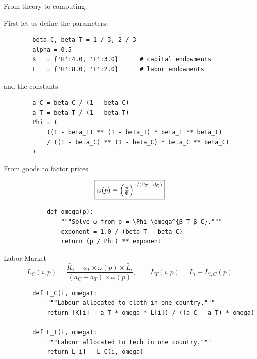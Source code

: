 \documentclass[notes,11pt, aspectratio=169, xcolor=table]{beamer}
\newenvironment{wideitemize}{\itemize\addtolength{\itemsep}{10pt}}{\enditemize}
\begin{document}
\begin{frame}[fragile=singleslide]{From theory to computing}

\begin{wideitemize}
    \item First let us define the parameters:

        \begin{verbatim}
        beta_C, beta_T = 1 / 3, 2 / 3
        alpha = 0.5
        K   = {'H':4.0, 'F':3.0}      # capital endowments
        L   = {'H':8.0, 'F':2.0}      # labor endowments
        \end{verbatim}    

    \item and the constants

        \begin{verbatim}
        a_C = beta_C / (1 - beta_C)
        a_T = beta_T / (1 - beta_T)
        Phi = (
            ((1 - beta_T) ** (1 - beta_T) * beta_T ** beta_T)
            / ((1 - beta_C) ** (1 - beta_C) * beta_C ** beta_C)
        )
        \end{verbatim}    

\end{wideitemize}
    
\end{frame}


\begin{frame}[fragile=singleslide]{From goods to factor prices}

    \begin{equation*}
    \boxed{
        \omega(p) \equiv \Bigl(\tfrac{p}{\Phi}\Bigr)^{1/(\beta_T-\beta_C)}
    }
    \end{equation*}

        
        \begin{verbatim}
            def omega(p):
                """Solve ω from p = \Phi \omega^{β_T-β_C}."""
                exponent = 1.0 / (beta_T - beta_C)
                return (p / Phi) ** exponent
        \end{verbatim}    

\end{frame}

\begin{frame}[fragile=singleslide]{Labor Market}
\begin{equation*}\label{eq: lc}
    \boxed{
    L_{C}(i,p) = \frac{\bar{K}_i - a_T \times \omega(p) \times \bar{L}_i}{(a_C- a_T) \times \omega(p)}, \qquad L_{T}(i,p) = \bar{L}_i - L_{i,C}(p)
    }
\end{equation*}

        \begin{verbatim}
        def L_C(i, omega):
            """Labour allocated to cloth in one country."""
            return (K[i] - a_T * omega * L[i]) / ((a_C - a_T) * omega)
        
        def L_T(i, omega):
            """Labour allocated to tech in one country."""
            return L[i] - L_C(i, omega)
        \end{verbatim}
    
\end{frame}
\end{document}
